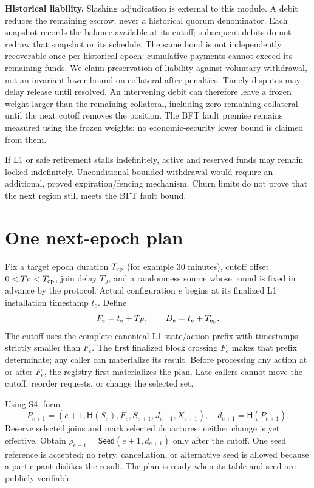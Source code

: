 \documentclass[11pt,a4paper]{article}
\newcommand{\Proc}[1]{\mathsf{#1}}
\newcommand{\Hash}{\mathsf H}
\begin{document}
\textbf{Historical liability.} Slashing adjudication is external to this
module. A debit reduces the remaining escrow, never a historical quorum
denominator. Each snapshot records the balance available at its cutoff;
subsequent debits do not redraw that snapshot or its schedule. The same
bond is not independently recoverable once per historical epoch: cumulative
payments cannot exceed its remaining funds. We claim preservation of
liability against voluntary withdrawal, not an invariant lower bound on
collateral after penalties. Timely disputes may delay release until resolved.
An intervening debit can therefore leave a frozen weight larger than the
remaining collateral, including zero remaining collateral until the next
cutoff removes the position. The BFT fault premise remains measured using
the frozen weights; no economic-security lower bound is claimed from them.

If L1 or safe retirement stalls indefinitely, active and reserved funds may
remain locked indefinitely. Unconditional bounded withdrawal would require
an additional, proved expiration/fencing mechanism. Churn limits do not
prove that the next region still meets the BFT fault bound.

\section{One next-epoch plan}
\label{sec:epoch}

Fix a target epoch duration $T_{\rm ep}$ (for example 30 minutes), cutoff
offset $0<T_F<T_{\rm ep}$, join delay $T_J$, and a randomness source whose
round is fixed in advance by the protocol. Actual configuration $e$ begins
at its finalized L1 installation timestamp $t_e$. Define
\[
 F_e=t_e+T_F,\qquad D_e=t_e+T_{\rm ep}.
\]
The cutoff uses the complete canonical L1 state/action prefix with timestamps
strictly smaller than $F_e$. The first finalized block crossing $F_e$
makes that prefix determinate; any caller can materialize its result.
Before processing any action at or after
$F_e$, the registry first materializes the plan. Late callers cannot move
the cutoff, reorder requests, or change the selected set.

Using S4, form
\[
P_{e+1}=(e+1,\Hash(S_e),F_e,S_{e+1},J_{e+1},X_{e+1}),\quad
d_{e+1}=\Hash(P_{e+1}).
\]
Reserve selected joins and mark selected departures; neither change is
yet effective. Obtain $\rho_{e+1}=\Proc{Seed}(e+1,d_{e+1})$ only after
the cutoff. One seed reference is accepted; no retry, cancellation, or
alternative seed is allowed because a participant dislikes the result.
The plan is ready when its table and seed are publicly verifiable.
\end{document}
